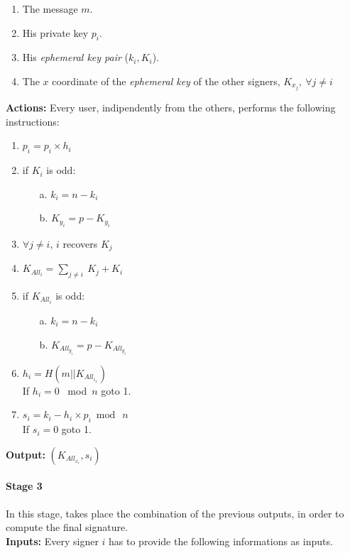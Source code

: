 \hspace{1.1cm}
\begin{minipage}[l]{2\linewidth}
	\begin{enumerate}
		\item The message $m$.
		\item His private key $p_{i}$.
		\item His \textit{ephemeral key pair} ($k_{i}, K_{i}$).
		\item The $x$ coordinate of the \textit{ephemeral key} of the other signers, $K_{x_{j}},\ \forall j\neq i$
	\end{enumerate}
\end{minipage}


\textbf{Actions:} Every user, indipendently from the others, performs the following instructions:

\hspace{1.2cm}
\begin{minipage}[l]{2\linewidth}
	\begin{enumerate}
		\item $p_{i}= p_{i}\times h_{i}$
		\item if $K_{i}$ is odd:
		\begin{itemize}
			\item[a.] $k_{i}=n-k_{i}$
			\item[b.] $K_{y_{i}}=p-K_{y_{i}}$
		\end{itemize}
		\item $\forall j\neq i$, $i$ recovers $K_{j}$
		\item $K_{All_{i}}=\sum_{j\neq i}\ {K_{j}}+K_{i}$
		\item if $K_{All_{i}}$ is odd:
		\begin{itemize}
			\item[a.] $k_{i}=n-k_{i}$
			\item[b.] $K_{All_{y_{i}}}=p-K_{All_{y_{i}}}$
		\end{itemize}
		\item $h_{i}=H(m||K_{All_{i_{x}}})$\\
		If $h_{i}=0$ \ mod\ $n$ goto 1.
		\item $s_{i}=k_{i} - h_{i} \times p_{i} \bmod\ n$ \\
		If $s_{i}=0$ goto 1.
	\end{enumerate}
\end{minipage}

\textbf{Output:} $(K_{All_{x_{i}}}, s_{i})$
\paragraph{Stage 3}
In this stage, takes place the combination of the previous outputs, in order to compute the final signature.\\
\textbf{Inputs:} Every signer $i$ has to provide the following informations as inputs.

